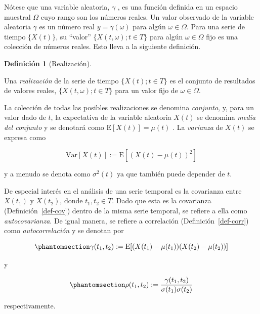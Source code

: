 \documentclass[
  us-letterpaper,
]{scrreprt}
\theoremstyle{definition}
\theoremstyle{plain}
\theoremstyle{plain}
\theoremstyle{definition}
\newtheorem{definition}{Definición}[chapter]
\theoremstyle{remark}
\begin{document}
Nótese que una variable aleatoria, \(\gamma\) , es una función definida
en un espacio muestral \(\Omega\) cuyo rango son los números reales. Un
valor observado de la variable aleatoria \(\gamma\) es un número real
\(y=\gamma(\omega)\) para algún \(\omega\in\Omega\). Para una serie de
tiempo \(\{X(t)\}\), su ``valor'' \(\{X(t,\omega);t\in T\}\) para algún
\(\omega\in\Omega\) fijo es una colección de números reales. Esto lleva
a la siguiente definición.

\begin{definition}[Realización]\protect\hypertarget{def-realizacion}{}\label{def-realizacion}

Una \emph{realización} de la serie de tiempo \(\{X(t);t\in T\}\) es el
conjunto de resultados de valores reales, \(\{X(t,\omega);t\in T\}\)
para un valor fijo de \(\omega \in \Omega\).

\end{definition}

La colección de todas las posibles realizaciones se denomina
\emph{conjunto}, y, para un valor dado de \(t\), la expectativa de la
variable aleatoria \(X(t)\) se denomina \emph{media del conjunto} y se
denotará como \(\mathrm E[X(t)]=\mu(t)\) . La \emph{varianza} de
\(X(t)\) se expresa como

\[
\mathrm{Var}[X(t)]:=\mathrm{E}[(X(t)-\mu(t))^2]
\]

y a menudo se denota como \(\sigma^2(t)\) ya que también puede depender
de \(t\).

\label{.remark}
De especial interés en el análisis de una serie temporal es la
covarianza entre \(X(t_1)\) y \(X(t_2)\), donde \(t_1, t_2\in T\). Dado
que esta es la covarianza (Definición~\ref{def-cov}) dentro de la misma
serie temporal, se refiere a ella como \emph{autocovarianza}. De igual
manera, se refiere a correlación (Definición~\ref{def-corr}) como
\emph{autocorrelación} y se denotan por

\begin{equation}\phantomsection\label{eq-autocov}{
\gamma(t_1,t_2):=\mathrm{E}[(X(t_1)-\mu(t_1))(X(t_2)-\mu(t_2))]
}\end{equation}

y

\begin{equation}\phantomsection\label{eq-autocorr}{
\rho(t_1,t_2):= \frac{\gamma(t_1,t_2)}{\sigma(t_1)\sigma(t_2)} 
}\end{equation}

respectivamente.
\end{document}
